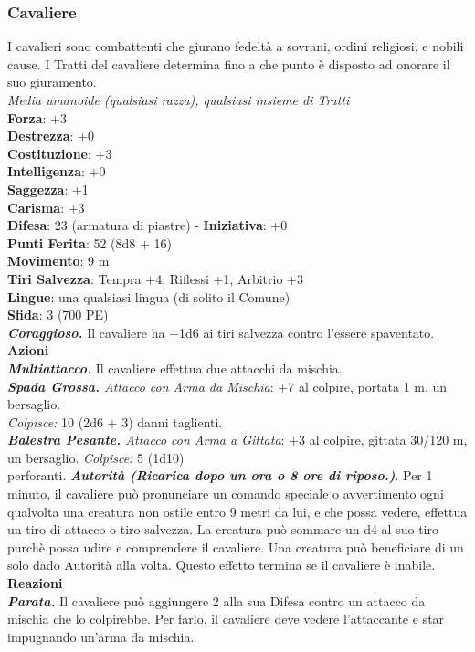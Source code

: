 \begin{multicols}{2}
\subsubsection*{Cavaliere}
I cavalieri sono combattenti che giurano fedeltà a sovrani, ordini religiosi, e nobili cause. I Tratti del cavaliere determina fino a che punto è disposto ad onorare il suo giuramento. \\
\emph{Media umanoide (qualsiasi razza), qualsiasi insieme di Tratti}\\
\textbf{Forza}: +3\\
\textbf{Destrezza}: +0\\
\textbf{Costituzione}: +3\\
\textbf{Intelligenza}: +0\\
\textbf{Saggezza}: +1\\
\textbf{Carisma}: +3\\
\textbf{Difesa}: 23 (armatura di piastre) - \textbf{Iniziativa}: +0\\
\textbf{Punti Ferita}: 52 (8d8 + 16)\\
\textbf{Movimento}: 9 m\\
\textbf{Tiri Salvezza}: Tempra +4, Riflessi +1, Arbitrio +3 \\
\textbf{Lingue}: una qualsiasi lingua (di solito il Comune)\\
\textbf{Sfida}: 3 (700 PE)\smallskip\\
\emph{\textbf{Coraggioso.}} Il cavaliere ha +1d6 ai tiri salvezza contro l'essere spaventato.\\
\smallskip\textbf{Azioni}\\
\emph{\textbf{Multiattacco.}} Il cavaliere effettua due attacchi da mischia.\\
\emph{\textbf{Spada Grossa.} Attacco con Arma da Mischia}: +7 al colpire, portata 1 m, un bersaglio.\\
\emph{Colpisce:} 10 (2d6 + 3) danni taglienti.\\
\emph{\textbf{Balestra Pesante.} Attacco con Arma a Gittata}: +3 al colpire, gittata 30/120 m, un bersaglio. \emph{Colpisce:} 5 (1d10)\\
perforanti.
\emph{\textbf{Autorità (Ricarica dopo un ora o 8 ore di riposo.)}}. Per 1 minuto, il cavaliere può pronunciare un comando speciale o avvertimento ogni qualvolta una creatura non ostile entro 9 metri da lui, e che possa vedere, effettua un tiro di attacco o tiro salvezza. La creatura può sommare un d4 al suo tiro purchè possa udire e comprendere il cavaliere. Una creatura può beneficiare di un solo dado Autorità alla volta. Questo effetto termina se il cavaliere è inabile. \\
\textbf{Reazioni}\\
\emph{\textbf{Parata.}} Il cavaliere può aggiungere 2 alla sua Difesa contro un attacco da mischia che lo colpirebbe. Per farlo, il cavaliere deve vedere l'attaccante e star impugnando un'arma da mischia.\\


\end{multicols}
